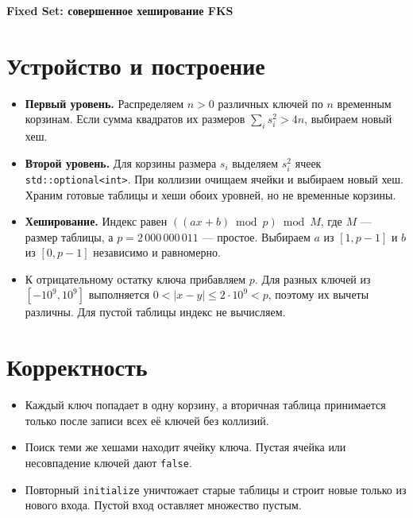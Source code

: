\documentclass[12pt,a4paper]{article}
\begin{document}
\begin{center}
  {\Large\bfseries Fixed Set: совершенное хеширование FKS}
\end{center}

\section*{Устройство и построение}
\begin{itemize}
  \setlength{\topsep}{3pt}
  \setlength{\itemsep}{0pt}
  \item \textbf{Первый уровень.} Распределяем $n>0$ различных ключей по $n$ временным корзинам.
    Если сумма квадратов их размеров $\sum_i s_i^2>4n$, выбираем новый хеш.
  \item \textbf{Второй уровень.} Для корзины размера $s_i$ выделяем $s_i^2$ ячеек \texttt{std::optional<int>}.
    При коллизии очищаем ячейки и выбираем новый хеш.
    Храним готовые таблицы и хеши обоих уровней, но не временные корзины.
  \item \textbf{Хеширование.} Индекс равен $((ax+b)\bmod p)\bmod M$, где $M$ --- размер таблицы,
    а $p=2\,000\,000\,011$ --- простое.
    Выбираем $a$ из $[1,p-1]$ и $b$ из $[0,p-1]$ независимо и равномерно.
  \item К отрицательному остатку ключа прибавляем $p$.
    Для разных ключей из $[-10^9,10^9]$ выполняется $0<|x-y|\le2\cdot10^9<p$, поэтому их вычеты различны.
    Для пустой таблицы индекс не вычисляем.
\end{itemize}

\section*{Корректность}
\begin{itemize}
  \setlength{\topsep}{3pt}
  \setlength{\itemsep}{0pt}
  \item Каждый ключ попадает в одну корзину, а вторичная таблица принимается только после записи всех её ключей
    без коллизий.
  \item Поиск теми же хешами находит ячейку ключа.
    Пустая ячейка или несовпадение ключей дают \texttt{false}.
  \item Повторный \texttt{initialize} уничтожает старые таблицы и строит новые только из нового входа.
    Пустой вход оставляет множество пустым.
\end{itemize}
\end{document}
